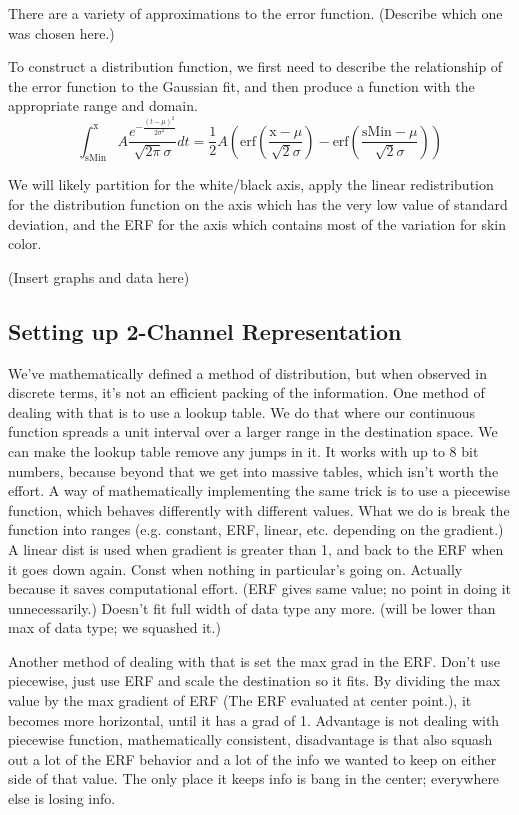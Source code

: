 \documentclass[10pt,a4paper]{article}
\begin{document}
There are a variety of approximations to the error function. (Describe which one was chosen here.)

To construct a distribution function, we first need to describe the relationship of the error function to the Gaussian fit, and then produce a function with the appropriate range and domain.
\begin{equation}\label{ErfDefinition}
  \int _{\text{sMin}}^{\text{x}} A \frac{e^{-\frac{(t-\mu )^2}{2 \sigma ^2}}}{\sqrt{2 \pi } \sigma }dt=\frac{1}{2} A \left(\text{erf}\left(\frac{\text{x}-\mu }{\sqrt{2} \sigma }\right)-\text{erf}\left(\frac{\text{sMin}-\mu }{\sqrt{2} \sigma }\right)\right)
\end{equation}

We will likely partition for the white/black axis, apply the linear redistribution for the distribution function on the axis which has the very low value of standard deviation, and the ERF for the axis which contains most of the variation for skin color.

(Insert graphs and data here)

\subsection{Setting up 2-Channel Representation}\label{sec:SettingUp2-ChannelRepresentation}
We've mathematically defined a method of distribution, but when observed in discrete terms, it's not an efficient packing of the information. One method of dealing with that is to use a lookup table. We do that where our continuous function spreads a unit interval over a larger range in the destination space. We can make the lookup table remove any jumps in it. It works with up to 8 bit numbers, because beyond that we get into massive tables, which isn't worth the effort. A way of mathematically implementing the same trick is to use a piecewise function, which behaves differently with different values. What we do is break the function into ranges (e.g. constant, ERF, linear, etc. depending on the gradient.) A linear dist is used when gradient is greater than 1, and back to the ERF when it goes down again. Const when nothing in particular's going on. Actually because it saves computational effort. (ERF gives same value; no point in doing it unnecessarily.) Doesn't fit full width of data type any more. (will be lower than max of data type; we squashed it.)

Another method of dealing with that is set the max grad in the ERF. Don't use piecewise, just use ERF and scale the destination so it fits. By dividing the max value by the max gradient of ERF (The ERF evaluated at center point.), it becomes more horizontal, until it has a grad of 1. Advantage is not dealing with piecewise function, mathematically consistent, disadvantage is that also squash out a lot of the ERF behavior and a lot of the info we wanted to keep on either side of that value. The only place it keeps info is bang in the center; everywhere else is losing info.
\end{document}
